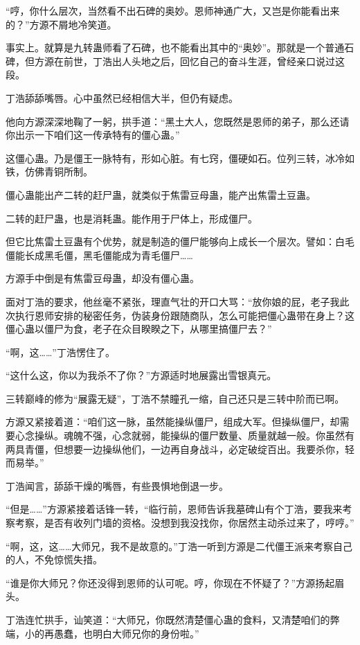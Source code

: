 \begin{this_body}
“哼，你什么层次，当然看不出石碑的奥妙。恩师神通广大，又岂是你能看出来的？”方源不屑地冷笑道。

事实上。就算是九转蛊师看了石碑，也不能看出其中的“奥妙”。那就是一个普通石碑，但方源在前世，丁浩出人头地之后，回忆自己的奋斗生涯，曾经亲口说过这段。

丁浩舔舔嘴唇。心中虽然已经相信大半，但仍有疑虑。

他向方源深深地鞠了一躬，拱手道：“黑土大人，您既然是恩师的弟子，那么还请你出示一下咱们这一传承特有的僵心蛊。”

这僵心蛊。乃是僵王一脉特有，形如心脏。有七窍，僵硬如石。位列三转，冰冷如铁，仿佛青铜所制。

僵心蛊能出产二转的赶尸蛊，就类似于焦雷豆母蛊，能产出焦雷土豆蛊。

二转的赶尸蛊，也是消耗蛊。能作用于尸体上，形成僵尸。

但它比焦雷土豆蛊有个优势，就是制造的僵尸能够向上成长一个层次。譬如：白毛僵能长成黑毛僵，黑毛僵能成为青毛僵尸……

方源手中倒是有焦雷豆母蛊，却没有僵心蛊。

面对丁浩的要求，他丝毫不紧张，理直气壮的开口大骂：“放你娘的屁，老子我此次执行恩师安排的秘密任务，伪装身份跟随商队，怎么可能把僵心蛊带在身上？这僵心蛊以僵尸为食，老子在众目睽睽之下，从哪里搞僵尸去？”

“啊，这……”丁浩愣住了。

“这什么这，你以为我杀不了你？”方源适时地展露出雪银真元。

三转巅峰的修为“展露无疑”，丁浩不禁瞳孔一缩，自己还只是三转中阶而已啊。

方源又紧接着道：“咱们这一脉，虽然能操纵僵尸，组成大军。但操纵僵尸，却需要心念操纵。魂魄不强，心念就弱，能操纵的僵尸数量、质量就越一般。你虽然有两具青僵，但想要一边操纵他们，一边再自身战斗，必定破绽百出。我要杀你，轻而易举。”

丁浩闻言，舔舔干燥的嘴唇，有些畏惧地倒退一步。

“但是……”方源紧接着话锋一转，“临行前，恩师告诉我墓碑山有个丁浩，要我来考察考察，是否有收列门墙的资格。没想到我没找你，你居然主动杀过来了，哼哼。”

“啊，这，这……大师兄，我不是故意的。”丁浩一听到方源是二代僵王派来考察自己的人，不免惊慌失措。

“谁是你大师兄？你还没得到恩师的认可呢。哼，你现在不怀疑了？”方源扬起眉头。

丁浩连忙拱手，讪笑道：“大师兄，你既然清楚僵心蛊的食料，又清楚咱们的弊端，小的再愚蠢，也明白大师兄你的身份啦。”


\end{this_body}
